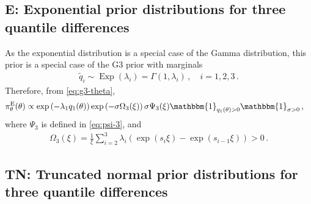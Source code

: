 \documentclass{article}
\begin{document}
\subsection{E: Exponential prior distributions for three quantile differences}
\label{section:prior-e}
%

%
As the exponential distribution is a special case of the Gamma distribution,
this prior is a special case of the G3 prior with marginals
%
\begin{align*}
	\tilde{q}_i \sim \operatorname{Exp}(\lambda_i)
		= \Gamma(1, \lambda_i) \,, \quad i = 1, 2, 3 \,.
\end{align*}
%
Therefore, from \eqref{eq:g3-theta},
\begin{align*}
	\pi^{\text{E}}_\theta(\theta)
		&\propto \exp\left(-\lambda_1 q_1(\theta)\right)
		\exp\left(-\sigma \Omega_3(\xi)\right) \sigma \Psi_3(\xi)
		\mathbbm{1}_{{q_1(\theta)} > 0}	\mathbbm{1}_{\sigma > 0} \,,
\end{align*}
%
where $\Psi_3$ is defined in \eqref{eq:psi-3}, and
%
\begin{align*}
	\Omega_3(\xi) = \frac{1}{\xi}
		\sum_{i=2}^3 \lambda_i(\exp(s_{i} \xi) - \exp(s_{i - 1} \xi)) > 0 \,.
\end{align*}
%
\subsection{TN: Truncated normal prior distributions for three quantile differences}
\label{section:prior-tn}
%
\end{document}
